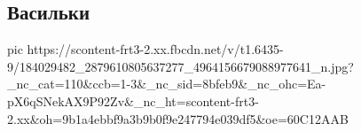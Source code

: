  
 
 
 
 
\subsection{Васильки}

\ifcmt
  pic https://scontent-frt3-2.xx.fbcdn.net/v/t1.6435-9/184029482_2879610805637277_4964156679088977641_n.jpg?_nc_cat=110&ccb=1-3&_nc_sid=8bfeb9&_nc_ohc=Ea-pX6qSNekAX9P92Zv&_nc_ht=scontent-frt3-2.xx&oh=9b1a4ebbf9a3b9b0f9e247794e039df5&oe=60C12AAB
\fi


